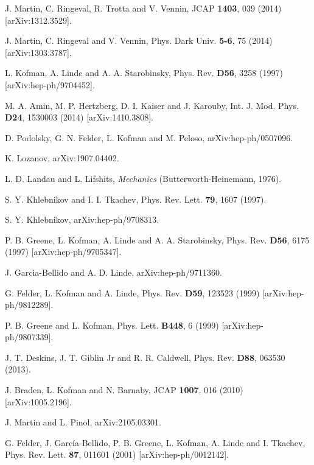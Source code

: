 \documentclass[11pt,a4paper,twoside]{book}
\begin{document}
\begin{thebibliography}{2}
	 J. Martin, C. Ringeval, R. Trotta and V. Vennin, JCAP \textbf{1403}, 039 (2014) [arXiv:1312.3529].
	
	 J. Martin, C. Ringeval and V. Vennin, Phys. Dark Univ. \textbf{5-6}, 75 (2014) [arXiv:1303.3787].
	
	 L. Kofman, A. Linde and A. A. Starobinsky, Phys. Rev. \textbf{D56}, 3258 (1997) [arXiv:hep-ph/9704452].
	
	 M. A. Amin, M. P. Hertzberg, D. I. Kaiser and J. Karouby, Int. J.  Mod. Phys. \textbf{D24}, 1530003 (2014) [arXiv:1410.3808].
	
	 D. Podolsky, G. N. Felder, L. Kofman and M. Peloso,  arXiv:hep-ph/0507096.
	
	 K. Lozanov, arXiv:1907.04402.
	
	 L. D. Landau and L. Lifshits, \textit{Mechanics} (Butterworth-Heinemann, 1976).
	
	 S. Y. Khlebnikov and I. I. Tkachev, Phys. Rev. Lett. \textbf{79}, 1607 (1997).
	
	 S. Y. Khlebnikov, arXiv:hep-ph/9708313.
	
	 P. B. Greene, L. Kofman, A. Linde and A. A. Starobinsky, Phys. Rev. \textbf{D56}, 6175 (1997) [arXiv:hep-ph/9705347].
	
	 J. Garcìa-Bellido and A. D. Linde, arXiv:hep-ph/9711360.
	
	 G. Felder, L. Kofman and A. Linde, Phys. Rev. \textbf{D59}, 123523 (1999) [arXiv:hep-ph/9812289].
	
	 P. B. Greene and L. Kofman, Phys. Lett. \textbf{B448}, 6 (1999) [arXiv:hep-ph/9807339].
	
	 J. T. Deskins, J. T. Giblin Jr and R. R. Caldwell, Phys. Rev. \textbf{D88}, 063530 (2013).
	
	 J. Braden, L. Kofman and N. Barnaby, JCAP \textbf{1007}, 016 (2010) [arXiv:1005.2196].
	
	 J. Martin and L. Pinol, arXiv:2105.03301.
	
	 G. Felder, J. Garc\'{i}a-Bellido, P. B. Greene, L. Kofman, A. Linde and I. Tkachev, Phys. Rev. Lett. \textbf{87}, 011601 (2001) [arXiv:hep-ph/0012142].
	

\end{thebibliography}
\end{document}
